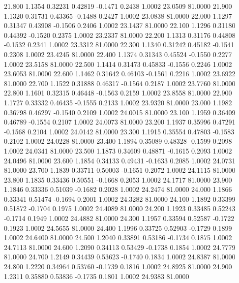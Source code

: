   21.800   1.1354   0.32231   0.42819  -0.1471   0.2438   1.0002  23.0509  81.0000
  21.900   1.1320   0.31731   0.43365  -0.1488   0.2427   1.0002  23.0838  81.0000
  22.000   1.1297   0.31347   0.43908  -0.1506   0.2406   1.0002  23.1437  81.0000
  22.100   1.1296   0.31180   0.44392  -0.1520   0.2375   1.0002  23.2337  81.0000
  22.200   1.1313   0.31176   0.44808  -0.1532   0.2341   1.0002  23.3312  81.0000
  22.300   1.1340   0.31242   0.45182  -0.1541   0.2308   1.0002  23.4245  81.0000
  22.400   1.1374   0.31343   0.45524  -0.1550   0.2277   1.0002  23.5158  81.0000
  22.500   1.1414   0.31473   0.45833  -0.1556   0.2246   1.0002  23.6053  81.0000
  22.600   1.1462   0.31642   0.46103  -0.1561   0.2216   1.0002  23.6922  81.0000
  22.700   1.1522   0.31888   0.46317  -0.1564   0.2187   1.0002  23.7760  81.0000
  22.800   1.1601   0.32315   0.46448  -0.1563   0.2159   1.0002  23.8558  81.0000
  22.900   1.1727   0.33332   0.46435  -0.1555   0.2133   1.0002  23.9320  81.0000
  23.000   1.1982   0.36798   0.46297  -0.1540   0.2109   1.0002  24.0015  81.0000
  23.100   1.1959   0.36409   0.46789  -0.1554   0.2107   1.0002  24.0073  81.0000
  23.200   1.1937   0.35996   0.47291  -0.1568   0.2104   1.0002  24.0142  81.0000
  23.300   1.1915   0.35554   0.47803  -0.1583   0.2102   1.0002  24.0228  81.0000
  23.400   1.1894   0.35089   0.48328  -0.1599   0.2098   1.0002  24.0341  81.0000
  23.500   1.1873   0.34609   0.48871  -0.1615   0.2093   1.0002  24.0496  81.0000
  23.600   1.1854   0.34133   0.49431  -0.1633   0.2085   1.0002  24.0731  81.0000
  23.700   1.1839   0.33711   0.50003  -0.1651   0.2072   1.0002  24.1115  81.0000
  23.800   1.1835   0.33436   0.50551  -0.1668   0.2053   1.0002  24.1717  81.0000
  23.900   1.1846   0.33336   0.51039  -0.1682   0.2028   1.0002  24.2474  81.0000
  24.000   1.1866   0.33341   0.51474  -0.1694   0.2001   1.0002  24.3282  81.0000
  24.100   1.1892   0.33399   0.51872  -0.1704   0.1975   1.0002  24.4089  81.0000
  24.200   1.1923   0.33485   0.52243  -0.1714   0.1949   1.0002  24.4882  81.0000
  24.300   1.1957   0.33594   0.52587  -0.1722   0.1923   1.0002  24.5655  81.0000
  24.400   1.1996   0.33725   0.52903  -0.1729   0.1899   1.0002  24.6400  81.0000
  24.500   1.2040   0.33891   0.53186  -0.1734   0.1875   1.0002  24.7113  81.0000
  24.600   1.2090   0.34113   0.53429  -0.1738   0.1854   1.0002  24.7779  81.0000
  24.700   1.2149   0.34439   0.53623  -0.1740   0.1834   1.0002  24.8387  81.0000
  24.800   1.2220   0.34964   0.53760  -0.1739   0.1816   1.0002  24.8925  81.0000
  24.900   1.2311   0.35880   0.53836  -0.1735   0.1801   1.0002  24.9383  81.0000
